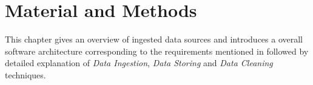 \section{Material and Methods}
\label{sec:material}
This chapter gives an overview of ingested data sources and introduces a overall software architecture corresponding to the requirements mentioned in  followed by detailed explanation of \textit{Data Ingestion}, \textit{Data Storing} and \textit{Data Cleaning} techniques.



